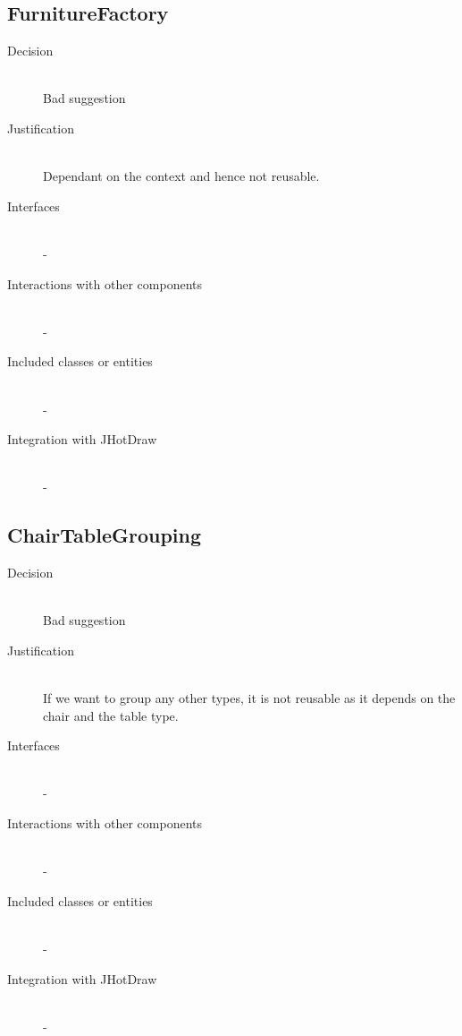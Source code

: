 \subsection{FurnitureFactory}
	\begin{description}
		\item[Decision] \hfill \\ Bad suggestion
		\item[Justification] \hfill \\ Dependant on the context and hence not reusable.
		\item[Interfaces] \hfill \\ -
		\item[Interactions with other components] \hfill \\ -
		\item[Included classes or entities] \hfill \\ -
		\item[Integration with JHotDraw] \hfill \\ -
	\end{description}

\subsection{ChairTableGrouping}
	\begin{description}
		\item[Decision] \hfill \\ Bad suggestion
		\item[Justification] \hfill \\ If we want to group any other types, it is not reusable as it depends on the chair and the table type.
		\item[Interfaces] \hfill \\ -
		\item[Interactions with other components] \hfill \\ -
		\item[Included classes or entities] \hfill \\ -
		\item[Integration with JHotDraw] \hfill \\ -
	\end{description}

